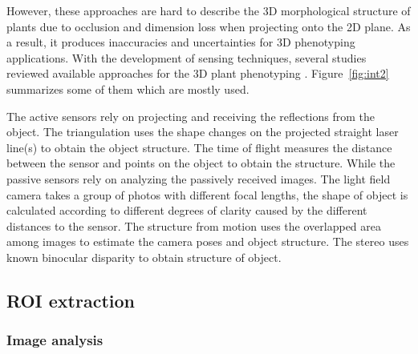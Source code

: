 However, these approaches are hard to describe the 3D morphological structure of plants due to occlusion and dimension loss when projecting onto the 2D plane. As a result, it produces inaccuracies and uncertainties for 3D phenotyping applications. With the development of sensing techniques, several studies reviewed available approaches for the 3D plant phenotyping \citep{paulus_measuring_2019, okura_3d_2022, kochi_introduction_2021}. Figure~\ref{fig:int2} summarizes some of them which are mostly used.




The active sensors rely on projecting and receiving the reflections from the object. The triangulation uses the shape changes on the projected straight laser line(s) to obtain the object structure. The time of flight measures the distance between the sensor and points on the object to obtain the structure. While the passive sensors rely on analyzing the passively received images. The light field camera takes a group of photos with different focal lengths, the shape of object is calculated according to different degrees of clarity caused by the different distances to the sensor. The structure from motion uses the overlapped area among images to estimate the camera poses and object structure. The stereo uses known binocular disparity to obtain structure of object.






\subsection{ROI extraction}

\subsubsection{Image analysis}

